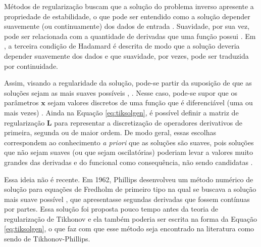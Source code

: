 Métodos de regularização buscam que a solução do problema inverso apresente a propriedade de estabilidade, o que pode ser entendido como a solução depender suavemente (ou continuamente) dos dados de entrada \cite[pág. 50]{Neto2005}. Suavidade, por sua vez, pode ser relacionada com a quantidade de derivadas que uma função possui  \cite[Apêndice A.2.1]{Choksi2022}. Em \cite[pág. 50]{Neto2005}, a terceira condição de Hadamard é descrita de modo que a solução deveria depender suavemente dos dados e que suavidade, por vezes, pode ser traduzida por continuidade. 

Assim, visando a regularidade da solução, pode-se partir da suposição de que as soluções sejam as mais suaves possíveis \cite[pág. 53]{hansen2010discrete}, \cite{Phillips1962}. Nesse caso, pode-se supor que os parâmetros $\mathbf{x}$ sejam valores discretos de uma função que é diferenciável (uma ou mais vezes) \cite[pág. 80]{kaipio2005statistical}.  Ainda na Equação \eqref{eq:tiksolgen}, é possível definir a matriz de regularização $\mathbf{L}$ para representar a discretização de operadores derivativos de primeira, segunda ou de maior ordem. De modo geral, essas escolhas correspondem ao conhecimento \textit{a priori} que as soluções são suaves, pois soluções que não sejam suaves (ou que sejam oscilatórias) poderiam levar a valores muito grandes das derivadas e do funcional como consequência, não sendo candidatas \cite[pág. 9]{Benning2018}. 

Essa ideia não é recente. Em 1962, Phillips desenvolveu um método numérico de solução para equações de Fredholm de primeiro tipo na qual se buscava a solução mais suave possível \cite{Phillips1962}, que apresentasse segundas derivadas que fossem contínuas por partes. Essa solução foi proposta pouco tempo antes da teoria de regularização de Tikhonov e ela também poderia ser escrita na forma da Equação \eqref{eq:tiksolgen}, o que faz com que esse método seja encontrado na literatura como sendo de Tikhonov-Phillips. 

